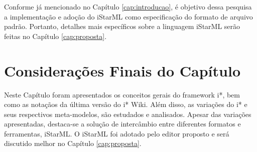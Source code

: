             Conforme já mencionado no Capítulo \ref{cap:introducao}, é objetivo dessa pesquisa a implementação e adoção do iStarML como especificação do formato de arquivo padrão. Portanto, detalhes mais específicos sobre a linguagem iStarML serão feitas no Capítulo \ref{cap:proposta}.


    
    \section{Considerações Finais do Capítulo}
        \label{cap:framework-sec:conclusao}
            Neste Capítulo foram apresentados
                os conceitos gerais do framework i*, bem como as notaçãos da última versão do i* Wiki.
            Além disso,
                as variações do i* e seus respectivos meta-modelos, são estudados e analisados.
            Apesar das variações apresentadas, destaca-se a solução de intercâmbio entre diferentes formatos e ferramentas, iStarML.
            O iStarML foi adotado pelo editor proposto e será discutido melhor no Capítulo \ref{cap:proposta}.

% 
